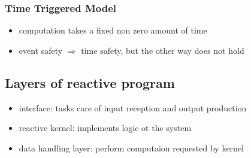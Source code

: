 \documentclass[german]{latex4ei/latex4ei_sheet}
\begin{document}
{\subsubsection{Time Triggered Model}
\begin{itemize}
\item computation takes a fixed non zero amount of time
\item event safety $\Rightarrow$ time safety, but the other way does not hold
\end{itemize}

\subsection{Layers of reactive program}
\begin{itemize}
\item interface: tasks care of input reception and output production
\item reactive kernel: implements logic ot the system
\item data handling layer: perform computaion requested by kernel
\end{itemize}
}
\end{document}
